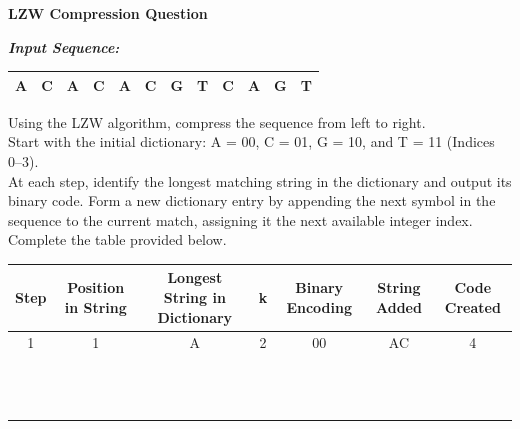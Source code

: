 \documentclass[11pt]{article}
\begin{document}
\begin{center}
{\Large \textbf{LZW Compression Question}}
\end{center}
\vspace{1em}
\noindent \textit{\textbf{Input Sequence:}}
\begin{center}
\renewcommand{\arraystretch}{1.5}
\begin{tabular}{|c|c|c|c|c|c|c|c|c|c|c|c|}
\hline
\rowcolor{white!95!black} A & C & A & C & A & C & G & T & C & A & G & T \\
\hline
\end{tabular}
\end{center}
\vspace{1em}
\noindent Using the LZW algorithm, compress the sequence from left to right. \\[1.5em]
Start with the initial dictionary: A = 00, C = 01, G = 10, and T = 11 (Indices 0--3). \\[1.5em]
At each step, identify the longest matching string in the dictionary and output its binary code. Form a new dictionary entry by appending the next symbol in the sequence to the current match, assigning it the next available integer index. Complete the table provided below.
\vspace{3em}
\par
\begin{center}
\small
\renewcommand{\arraystretch}{1.4}
\begin{tabular}{|c|c|c|c|c|c|c|}
\hline
\rowcolor{lightgray} Step & Position in String & Longest String in Dictionary & k & Binary Encoding & String Added & Code Created \\
\hline
\rowcolor{white!92!black} 1 & 1 & A & 2 & 00 & AC & 4 \\ \hline
 & & & & & & \\ \hline
 & & & & & & \\ \hline
 & & & & & & \\ \hline
 & & & & & & \\ \hline
 & & & & & & \\ \hline
 & & & & & & \\ \hline
 & & & & & & \\ \hline
 & & & & & & \\ \hline
 & & & & & & \\ \hline
 & & & & & & \\ \hline
 & & & & & & \\ \hline
 & & & & & & \\ \hline
\end{tabular}
\end{center}
\vspace{1em}
\end{document}
